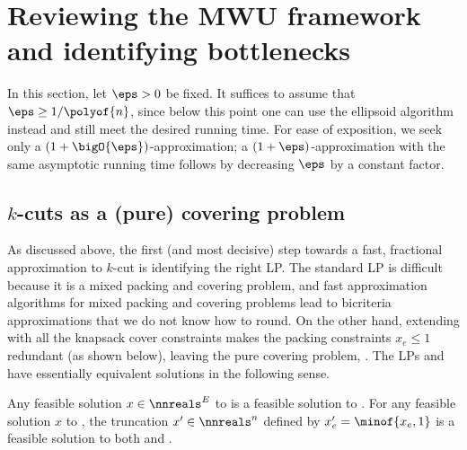 \documentclass{toc}
\begin{document}
\section{Reviewing the MWU framework and identifying bottlenecks}


In this section, let $\eps > 0$ be fixed. It suffices to assume that
$\eps \geq 1 / \polyof{n}$, since below this point one can use the
ellipsoid algorithm instead and still meet the desired running
time. For ease of exposition, we seek only a
%
$(1 + \bigO{\eps})$-approximation; a %
$(1 + \eps)$-approximation with the same
asymptotic running time follows by decreasing $\eps$ by a constant
factor.

\subsection{$k$-cuts as a (pure) covering problem}
As discussed above, the first (and most decisive) step towards a fast,
fractional approximation to $k$-cut is identifying the right LP. The
standard LP  is difficult because it is a mixed
packing and covering problem, and fast approximation algorithms for
mixed packing and covering problems lead to bicriteria approximations
that we do not know how to round. On the other hand, extending
 with all the knapsack cover constraints makes the
packing constraints $x_e \leq 1$ redundant (as shown below), leaving
the pure covering problem, . The LPs 
and  have essentially equivalent solutions in the
following sense.
\begin{lemma}
   Any feasible solution $x \in \nnreals^E$ to
   is a feasible solution to . For any
  feasible solution $x$ to , the truncation
  $x' \in \nnreals^n$ defined by $x_e' = \minof{x_e,1}$ is a feasible
  solution to both  and .
\end{lemma}
\end{document}
